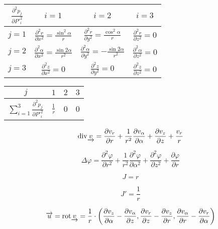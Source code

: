 \begin{tabular}{| c || c | c | c |}
\hline
\(\frac{\partial^2 p_j}{\partial P'^2_i}\) & \(i=1\) & \(i=2\) & \(i=3\) \\
\hline
\hline
\(j=1\) & \(\frac{\partial^2 r}{\partial x^2} = \frac{\sin^2 \alpha}{r}\) & \(\frac{\partial^2 r}{\partial y^2} = \frac{\cos^2 \alpha}{r}\) & \(\frac{\partial^2 r}{\partial z^2} = 0\) \\
\hline
\(j=2\) & \(\frac{\partial^2 \alpha}{\partial x^2} = \frac{\sin 2 \alpha}{r^2}\) & \(\frac{\partial^2 \alpha}{\partial y^2} = -\frac{\sin 2\alpha}{r^2}\) & \(\frac{\partial^2 \alpha}{\partial z^2} = 0\) \\
\hline
\(j=3\) & \(\frac{\partial^2 z}{\partial x^2} = 0\) & \(\frac{\partial^2 z}{\partial y^2} = 0\) & \(\frac{\partial^2 z}{\partial z^2} = 0\) \\
\hline
\end{tabular}


\begin{tabular}{| c || c | c | c |}
\hline
\(j\) & \(1\) & \(2\) & \(3\) \\
\hline
\hline
\(\sum_{i=1}^3 \frac{\partial^2 p_j}{\partial P'^2_i}\) & \(\frac{1}{r}\) & 0 & 0 \\
\hline
\end{tabular}

\begin{equation}
\label{eq:cylindricky_ss_div}
\mathrm{div}{\underrightarrow{v}} = \frac{\partial v_r}{\partial r} + \frac{1}{r^2} \frac{\partial v_{\alpha}}{\partial \alpha} + \frac{\partial v_z}{\partial z} + \frac{v_r}{r}
\end{equation}

\begin{equation}
\label{eq:cylindricky_ss_laplace}
\Delta \varphi = \frac{\partial^2 \varphi}{\partial r^2} + \frac{1}{r^2} \frac{\partial^2 \varphi}{\partial \alpha^2} + \frac{\partial^2 \varphi}{\partial z^2} + \frac{\partial \varphi}{\partial r}
\end{equation}

\begin{equation}
\label{eq:cylindricky_ss_j}
J = r
\end{equation}

\begin{equation}
\label{eq:cylindricky_ss_j_inv}
J' = \frac{1}{r}
\end{equation}

\begin{equation}
\label{eq:cylindricky_ss_rotace}
\overrightarrow{u} = \mathrm{rot} \underrightarrow{v} = \frac{1}{r} \cdot \left( \frac{\partial v_{z}}{\partial \alpha} - \frac{\partial v_{\alpha}}{\partial z}, \frac{\partial v_{r}}{\partial z} - \frac{\partial v_{z}}{\partial r}, \frac{\partial v_{\alpha}}{\partial r} - \frac{\partial v_{r}}{\partial \alpha} \right)
\end{equation}


